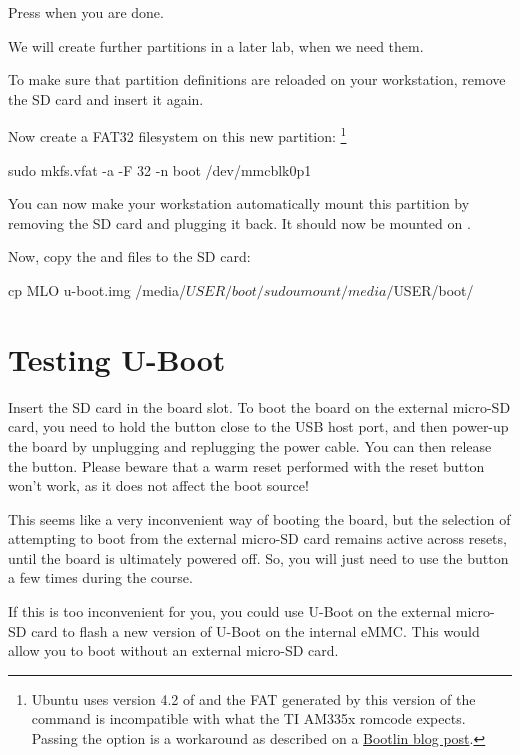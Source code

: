 Press  when you are done.

We will create further partitions in a later lab, when we need them.

To make sure that partition definitions are reloaded on your
workstation, remove the SD card and insert it again.

Now create a FAT32 filesystem on this new partition:
\footnote{Ubuntu uses version 4.2 of  and the FAT
generated by this version of the command is incompatible with what
the TI AM335x romcode expects. Passing the  option
is a workaround as described on a \href{https://bootlin.com/blog/workaround-for-creating-bootable-fat-partition-for-beagle-bone-am335x-on-recent-distros/}
{Bootlin blog post}.}
\begin{bashinput}
sudo mkfs.vfat -a -F 32 -n boot /dev/mmcblk0p1
\end{bashinput}

You can now make your workstation automatically mount this
partition by removing the SD card and plugging it back. It should
now be mounted on .

Now, copy the  and  files to the SD card:
\begin{bashinput}
cp MLO u-boot.img /media/$USER/boot/
sudo umount /media/$USER/boot/
\end{bashinput}

\section{Testing U-Boot}

Insert the SD card in the board slot. To boot the board on the external micro-SD
card, you need to hold the  button close to the USB host port,
and then power-up the board by unplugging and replugging the power cable.  You
can then release the  button. Please beware that a warm reset
performed with the reset button won't work, as it does not affect the boot
source!

This seems like a very inconvenient way of booting the board, but
the selection of attempting to boot from the external micro-SD card
remains active across resets, until the board is ultimately powered off.
So, you will just need to use the button a few times during the course.

If this is too inconvenient for you, you could use U-Boot on the
external micro-SD card to flash a new version of U-Boot on the internal
eMMC. This would allow you to boot without an external micro-SD card.


